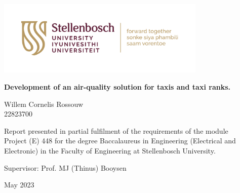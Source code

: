 \graphicspath{{frontmatter/fig/}}

\begin{titlepage}
	\begin{center}
		
		\includegraphics[width=10cm]{SU_corporate_horizontal_with_slogan_RGB}
		
		\vfill
		
		{\rmfamily  \bfseries \huge Development of an air-quality solution for taxis and taxi ranks. \par}
		
		\vfill
		
		{\large {\Large Willem Cornelis Rossouw} \\ 22823700 \par}
		
		\vfill
		
		\vfill
		
		 {\large Report presented in partial fulfilment of the requirements of the module \\ Project (E) 448 for the degree Baccalaureus in Engineering (Electrical and Electronic) in the Faculty of Engineering at Stellenbosch University. \par}



		
		\vfill
		
		{\large {Supervisor}: Prof. MJ (Thinus) Booysen } %
		
		\vfill
		
		{\Large May 2023}
	\end{center}
\end{titlepage}
